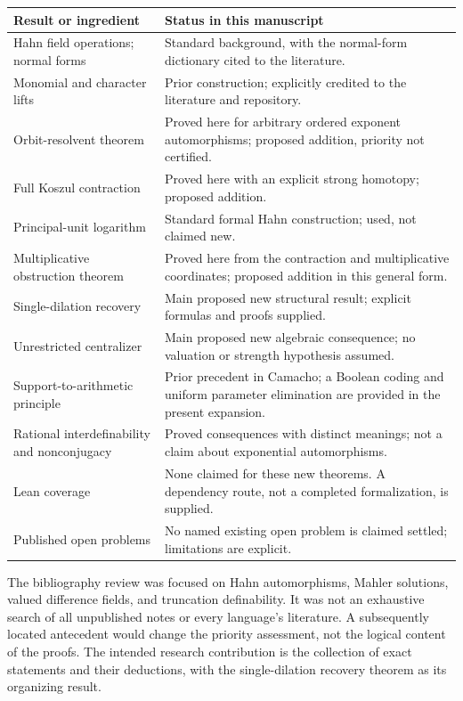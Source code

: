 \documentclass[11pt,oneside]{article}
\numberwithin{equation}{section}
\theoremstyle{definition}
\theoremstyle{remark}
\begin{document}
\begin{longtable}{@{}>{\raggedright\arraybackslash}p{}>{\raggedright\arraybackslash}p{}@{}}
\toprule
Result or ingredient & Status in this manuscript \\
\midrule\endhead
Hahn field operations; normal forms & Standard background, with the normal-form dictionary cited to the literature.\\
Monomial and character lifts & Prior construction; explicitly credited to the literature and repository.\\
Orbit-resolvent theorem & Proved here for arbitrary ordered exponent automorphisms; proposed addition, priority not certified.\\
Full Koszul contraction & Proved here with an explicit strong homotopy; proposed addition.\\
Principal-unit logarithm & Standard formal Hahn construction; used, not claimed new.\\
Multiplicative obstruction theorem & Proved here from the contraction and multiplicative coordinates; proposed addition in this general form.\\
Single-dilation recovery & Main proposed new structural result; explicit formulas and proofs supplied.\\
Unrestricted centralizer & Main proposed new algebraic consequence; no valuation or strength hypothesis assumed.\\
Support-to-arithmetic principle & Prior precedent in Camacho; a Boolean coding and uniform parameter elimination are provided in the present expansion.\\
Rational interdefinability and nonconjugacy & Proved consequences with distinct meanings; not a claim about exponential automorphisms.\\
Lean coverage & None claimed for these new theorems. A dependency route, not a completed formalization, is supplied.\\
Published open problems & No named existing open problem is claimed settled; limitations are explicit.\\
\bottomrule
\end{longtable}

The bibliography review was focused on Hahn automorphisms, Mahler
solutions, valued difference fields, and truncation definability. It was
not an exhaustive search of all unpublished notes or every language's
literature. A subsequently located antecedent would change the priority
assessment, not the logical content of the proofs. The intended research
contribution is the collection of exact statements and their deductions,
with the single-dilation recovery theorem as its organizing result.
\end{document}
